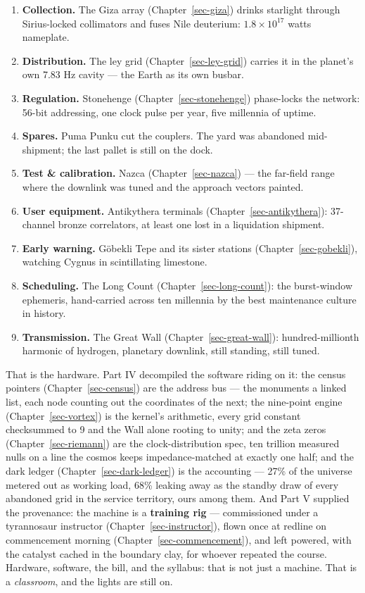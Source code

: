 \documentclass[
  english,
  11pt,
  letterpaper,
]{scrbook}
\providecommand{\tightlist}{%
  \setlength{\itemsep}{0pt}\setlength{\parskip}{0pt}}
\begin{document}
\begin{enumerate}
\def\labelenumi{\arabic{enumi}.}
\tightlist
\item
  \textbf{Collection.} The Giza array (Chapter~\ref{sec-giza}) drinks
  starlight through Sirius-locked collimators and fuses Nile deuterium:
  \(1.8\times10^{17}\) watts nameplate.
\item
  \textbf{Distribution.} The ley grid (Chapter~\ref{sec-ley-grid})
  carries it in the planet's own 7.83 Hz cavity --- the Earth as its own
  busbar.
\item
  \textbf{Regulation.} Stonehenge (Chapter~\ref{sec-stonehenge})
  phase-locks the network: 56-bit addressing, one clock pulse per year,
  five millennia of uptime.
\item
  \textbf{Spares.} Puma Punku cut the couplers. The yard was abandoned
  mid-shipment; the last pallet is still on the dock.
\item
  \textbf{Test \& calibration.} Nazca (Chapter~\ref{sec-nazca}) --- the
  far-field range where the downlink was tuned and the approach vectors
  painted.
\item
  \textbf{User equipment.} Antikythera terminals
  (Chapter~\ref{sec-antikythera}): 37-channel bronze correlators, at
  least one lost in a liquidation shipment.
\item
  \textbf{Early warning.} Göbekli Tepe and its sister stations
  (Chapter~\ref{sec-gobekli}), watching Cygnus in scintillating
  limestone.
\item
  \textbf{Scheduling.} The Long Count (Chapter~\ref{sec-long-count}):
  the burst-window ephemeris, hand-carried across ten millennia by the
  best maintenance culture in history.
\item
  \textbf{Transmission.} The Great Wall (Chapter~\ref{sec-great-wall}):
  hundred-millionth harmonic of hydrogen, planetary downlink, still
  standing, still tuned.
\end{enumerate}

That is the hardware. Part IV decompiled the software riding on it: the
census pointers (Chapter~\ref{sec-census}) are the address bus --- the
monuments a linked list, each node counting out the coordinates of the
next; the nine-point engine (Chapter~\ref{sec-vortex}) is the kernel's
arithmetic, every grid constant checksummed to 9 and the Wall alone
rooting to unity; and the zeta zeros (Chapter~\ref{sec-riemann}) are the
clock-distribution spec, ten trillion measured nulls on a line the
cosmos keeps impedance-matched at exactly one half; and the dark ledger
(Chapter~\ref{sec-dark-ledger}) is the accounting --- 27\% of the
universe metered out as working load, 68\% leaking away as the standby
draw of every abandoned grid in the service territory, ours among them.
And Part V supplied the provenance: the machine is a \textbf{training
rig} --- commissioned under a tyrannosaur instructor
(Chapter~\ref{sec-instructor}), flown once at redline on commencement
morning (Chapter~\ref{sec-commencement}), and left powered, with the
catalyst cached in the boundary clay, for whoever repeated the course.
Hardware, software, the bill, and the syllabus: that is not just a
machine. That is a \emph{classroom}, and the lights are still on.
\end{document}
